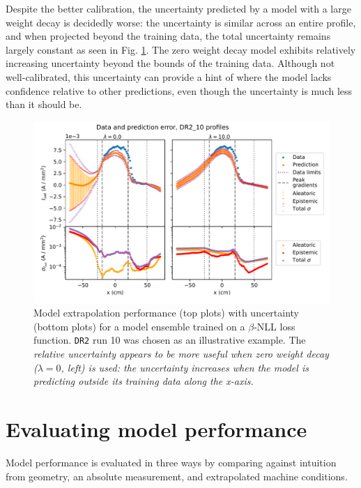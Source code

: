 Despite the better calibration, the uncertainty predicted by a model with a large weight decay is decidedly worse: the uncertainty is similar across an entire profile, and when projected beyond the training data, the total uncertainty remains largely constant as seen in Fig. \ref{fig:extrapolation-profile-var_two}. The zero weight decay model exhibits relatively increasing uncertainty beyond the bounds of the training data. Although not well-calibrated, this uncertainty can provide a hint of where the model lacks confidence relative to other predictions, even though the uncertainty is much less than it should be.

\begin{figure}
	\centering
	\includegraphics[width=\linewidth]{figures/extrapolation-profile-variance_DR2_10_wd-comparison_two.pdf}
	\caption[Model extrapolation performance and uncertainty]{\label{fig:extrapolation-profile-var_two}Model extrapolation performance (top plots) with uncertainty (bottom plots) for a model ensemble trained on a $\beta$-NLL loss function. \texttt{DR2} run 10 was chosen as an illustrative example. The \em relative \em uncertainty appears to be more useful when zero weight decay ($\lambda = 0$, left) is used: the uncertainty increases when the model is predicting outside its training data along the x-axis.}
\end{figure}

\section{Evaluating model performance}
\label{sec:validation}

Model performance is evaluated in three ways by comparing against intuition from geometry, an absolute measurement, and extrapolated machine conditions. 

